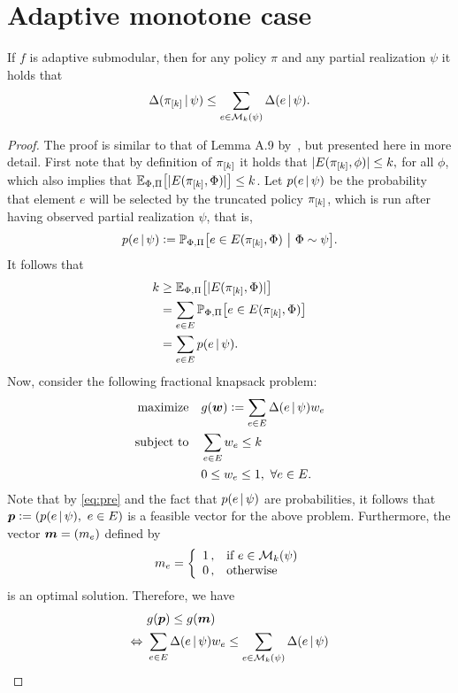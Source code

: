 \section{Adaptive monotone case}

\begin{lemma}\label{lem:mon_subm}
  If $f$ is adaptive submodular, then for any policy $\pi$ and any partial realization $\psi$ it holds that
  \begin{align*}
    \Delta(\pi_{[k]}\,\vert\,\psi) \leq \sum_{e \in \mathcal{M}_k(\psi)} \Delta(e\,\vert\,\psi).
  \end{align*}
\end{lemma}
\begin{proof}
  The proof is similar to that of Lemma A.9 by~\citet{golovin11}, but presented here in more detail.
  First note that by definition of $\pi_{[k]}$ it holds that $|E(\pi_{[k]}, \phi)| \leq k,$ for all $\phi$, which also implies that $\E[\Phi,\Pi]{|E(\pik, \Phi)|} \leq k$.
  Let $p(e\,\vert\,\psi)$ be the probability that element $e$ will be selected by the truncated policy $\pi_{[k]}$, which is run after having observed partial realization $\psi$, that is,
  \begin{align*}
    p(e\mmid\psi) \defeq \P[\Phi,\Pi]{e \in E(\pik, \Phi)}[\Phi \sim \psi].
  \end{align*}
  It follows that
  \begin{align}
    \label{eq:pre}
    \begin{split}
      k &\geq \E[\Phi, \Pi]{|E(\pik, \Phi)|}\\
        &= \sum_{e \in E}\P[\Phi,\Pi]{e \in E(\pik, \Phi)}\\
        &= \sum_{e \in E}p(e\mmid\psi).
    \end{split}
  \end{align}
  Now, consider the following fractional knapsack problem:
  \begin{align*}
    \textrm{maximize} & \quad g(\bm{w}) \vcentcolon= \sum_{e \in E}\Delta(e\,\vert\,\psi)w_e\\
    \textrm{subject to} & \quad \sum_{e \in E}w_e \leq k\\
               & \quad 0 \leq w_e \leq 1,\ \forall e \in E.
  \end{align*}
  Note that by \eqref{eq:pre} and the fact that $p(e\,\vert\,\psi)$ are probabilities, it follows that $\*p \defeq \left(p(e\mmid\psi),\ e \in E\right)$ is a feasible vector for the above problem.
  Furthermore, the vector $\bm{m} = (m_e)$ defined by
  \begin{align*}
    m_e = \twopartdefo{1}{e \in \mathcal{M}_k(\psi)}{0}
  \end{align*}
  is an optimal solution. 
  Therefore, we have
  \begin{align}\label{eq:knap}
                    &\ g(\bm{p}) \leq g(\bm{m}) \notag\\
    \Leftrightarrow &\ \sum_{e \in E}\Delta(e\,\vert\,\psi)w_e \leq \sum_{e \in \mathcal{M}_k(\psi)} \Delta(e\,\vert\,\psi)
  \end{align}
  

\end{proof}
